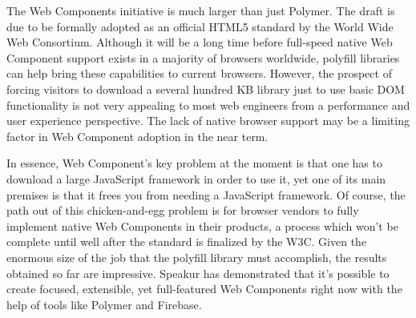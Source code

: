 The Web Components initiative is much larger than just Polymer.
The draft is due to be formally adopted as an official HTML5 standard by the World Wide Web Consortium.
Although it will be a long time before full-speed native Web Component support exists in a majority of browsers worldwide, 
polyfill libraries can help bring these capabilities to current browsers.
However, the prospect of forcing visitors to download a several hundred KB library just to use basic DOM functionality is not very appealing to most web engineers from a performance and user experience perspective.
The lack of native browser support may be a limiting factor in Web Component adoption in the near term.

In essence, Web Component's key problem at the moment is that one has to download a large JavaScript framework in order to use it, 
yet one of its main premises is that it frees you from needing a JavaScript framework.
Of course, the path out of this chicken-and-egg problem is for browser vendors to fully implement native Web Components in their products,
a process which won't be complete until well after the standard is finalized by the W3C.
Given the enormous size of the job that the polyfill library must accomplish, the results obtained so far are impressive. 
Speakur has demonstrated that it's possible to create focused, extensible, yet full-featured Web Components right now with the help of tools like Polymer and Firebase.
